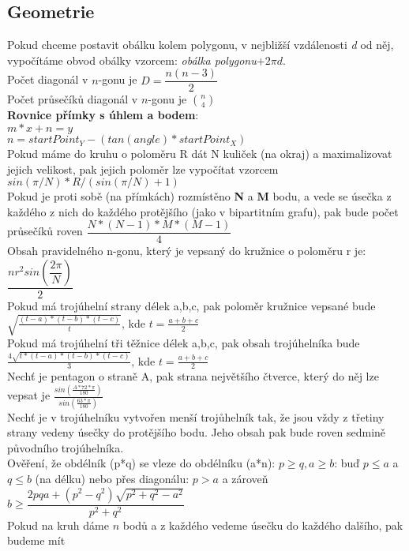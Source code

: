 \documentclass[11pt]{article}
\begin{document}
\subsection{Geometrie}
Pokud chceme postavit obálku kolem polygonu, v nejbližší vzdálenosti \textit{d} od něj, vypočítáme obvod obálky vzorcem: \textit{obálka polygonu}$+2\pi d$.
\\Počet diagonál v $n$-gonu je $D=\dfrac{n(n-3)}{2}$
\\Počet průsečíků diagonál v $n$-gonu je $\binom{n}{4}$
\\\textbf{Rovnice přímky s úhlem a bodem}:
\\$m*x+n=y$
\\$n = startPoint_Y - (tan ( angle) * startPoint_X )$
\\Pokud máme do kruhu o poloměru \textsf{R} dát \textsf{N} kuliček (na okraj) a maximalizovat jejich velikost, pak jejich poloměr lze vypočítat vzorcem $sin(\pi/N)*R/(sin(\pi /N)+1)$
\\Pokud je proti sobě (na přímkách) rozmístěno \textbf{N} a \textbf{M} bodu, a vede se úsečka z každého z nich do každého protějšího (jako v bipartitním grafu), pak bude počet průsečíků roven $\dfrac{N*(N-1)*M*(M-1)}{4}$
\\Obsah pravidelného \textsf{n}-gonu, který je vepsaný do kružnice o poloměru \textsf{r} je:  $\dfrac{nr^2sin(\dfrac{2\pi}{N})}{2}$
\\Pokud má trojúhelní strany délek \textsf{a},\textsf{b},\textsf{c}, pak poloměr kružnice vepsané bude $\sqrt{\frac{(t-a)*(t-b)*(t-c)}{t}}$, kde $t=\frac{a+b+c}{2}$
\\Pokud má trojúhelní tři těžnice délek \textsf{a},\textsf{b},\textsf{c}, pak obsah trojúhelníka bude $\frac{4\sqrt{t*(t-a)*(t-b)*(t-c)}}{3}$, kde $t=\frac{a+b+c}{2}$
\\Nechť je pentagon o straně \textsf{A}, pak strana největšího čtverce, který do něj lze vepsat je $\frac{sin(\frac{A*72*\pi}{180})}{sin(\frac{63*\pi}{180})}$
\\Nechť je v trojúhelníku vytvořen menší trojůhelník tak, že jsou vždy z třetiny strany vedeny úsečky do protějšího bodu. Jeho obsah pak bude roven sedmině původního trojúhelníka.
\\Ověření, že obdélník (p*q) se vleze do obdélníku (a*n): $p\geq q,a\geq b$: buď $p\leq a$ a $q\leq b$ (na délku) nebo přes diagonálu: $p>a$ a zároveň $b\geq \dfrac{2pqa+(p^2-q^2)\sqrt{p^2+q^2-a^2}}{p^2+q^2}$
\\Pokud na kruh dáme $n$ bodů a z každého vedeme úsečku do každého dalšího, pak budeme mít 
\end{document}
